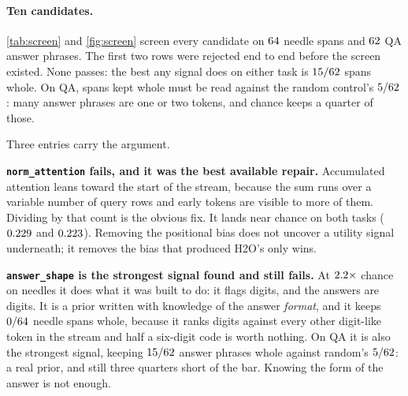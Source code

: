 \documentclass[10pt]{article}
\begin{document}
\paragraph{Ten candidates.} \cref{tab:screen} and \cref{fig:screen}
screen every candidate on $\ScreenSpansNeedle$ needle spans and
$\ScreenSpansQA$ QA answer phrases. The first two rows were rejected end to
end before the screen existed. None passes: the best any signal does on either
task is $15/62$ spans whole. On QA, spans kept whole must be read
against the random control's $\RandomWholeQA$: many answer phrases are one or
two tokens, and chance keeps a quarter of those.

\begin{table}[ht]\centering\small
\caption{Ten task-agnostic candidate signals, none passing the screen.
Mean coverage of answer spans inside the top $B$ at $B{=}2048$, where chance is
$0.25$, over $\ScreenSpansNeedle$ needle spans and $\ScreenSpansQA$ QA answer
phrases. \texttt{random} is the control: on QA, where many answers are one or
two tokens, it keeps $\RandomWholeQA$ spans whole by chance.}
\label{tab:screen}
\TabScreen
\end{table}



Three entries carry the argument.

\textbf{\texttt{norm\_attention} fails, and it was the best available repair.}
Accumulated attention leans toward the start of the stream, because the sum
runs over a variable number of query rows and early tokens are visible to more
of them. Dividing by that count is the obvious fix. It lands near chance on
both tasks ($0.229$ and $0.223$). Removing the
positional bias does not uncover a utility signal underneath; it removes the
bias that produced H2O's only wins.

\textbf{\texttt{answer\_shape} is the strongest signal found and still fails.}
At $2.2\times$ chance on needles it does what it was built to do:
it flags digits, and the answers are digits. It is a prior written with
knowledge of the answer \emph{format}, and it keeps $0/64$
needle spans whole, because it ranks digits against every other digit-like
token in the stream and half a six-digit code is worth nothing. On QA it is
also the strongest signal, keeping $15/62$ answer phrases whole
against random's $\RandomWholeQA$: a real prior, and still three quarters
short of the bar. Knowing the form of the answer is not enough.
\end{document}

